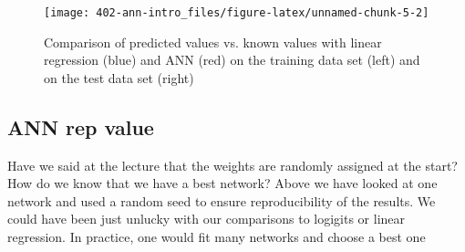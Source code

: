 \documentclass[
]{book}
\newenvironment{Shaded}{\begin{snugshade}}{\end{snugshade}}
\newcommand{\DataTypeTok}[1]{\textcolor[rgb]{0.13,0.29,0.53}{#1}}
\newcommand{\DecValTok}[1]{\textcolor[rgb]{0.00,0.00,0.81}{#1}}
\newcommand{\KeywordTok}[1]{\textcolor[rgb]{0.13,0.29,0.53}{\textbf{#1}}}
\newcommand{\NormalTok}[1]{#1}
\newcommand{\OperatorTok}[1]{\textcolor[rgb]{0.81,0.36,0.00}{\textbf{#1}}}
\newcommand{\StringTok}[1]{\textcolor[rgb]{0.31,0.60,0.02}{#1}}
\theoremstyle{definition}
\theoremstyle{definition}
\theoremstyle{definition}
\theoremstyle{remark}
\begin{document}
\begin{Shaded}
\end{Shaded}

\begin{figure}

{\centering \texttt{[image: 402-ann-intro\_files/figure-latex/unnamed-chunk-5-2]} 

}

\caption{Comparison of predicted values vs. known values with linear regression (blue) and ANN (red) on the training data set (left) and on the test data set (right)}\label{fig:unnamed-chunk-5-2}
\end{figure}

\hypertarget{ann-rep-value}{%
\subsection{ANN rep value}\label{ann-rep-value}}

Have we said at the lecture that the weights are randomly assigned at the start? How do we know that we have a best network? Above we have looked at one network and used a random seed to ensure reproducibility of the results. We could have been just unlucky with our comparisons to logigits or linear regression. In practice, one would fit many networks and choose a best one
\end{document}
